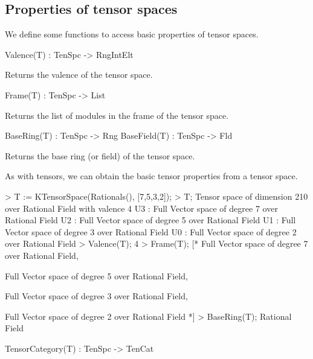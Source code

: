 \subsection{Properties of tensor spaces}

We define some functions to access basic properties of tensor spaces.

\begin{intrinsics}
Valence(T) : TenSpc -> RngIntElt
\end{intrinsics}

Returns the valence of the tensor space.

\begin{intrinsics}
Frame(T) : TenSpc -> List
\end{intrinsics}

Returns the list of modules in the frame of the tensor space.

\begin{intrinsics}
BaseRing(T) : TenSpc -> Rng
BaseField(T) : TenSpc -> Fld
\end{intrinsics}

Returns the base ring (or field) of the tensor space.

\begin{example}[TenSpcProperties]

As with tensors, we can obtain the basic tensor properties from a tensor space.
\begin{code}
> T := KTensorSpace(Rationals(), [7,5,3,2]);
> T;
Tensor space of dimension 210 over Rational Field with valence 4
U3 : Full Vector space of degree 7 over Rational Field
U2 : Full Vector space of degree 5 over Rational Field
U1 : Full Vector space of degree 3 over Rational Field
U0 : Full Vector space of degree 2 over Rational Field
> Valence(T);
4
> Frame(T);
[*
    Full Vector space of degree 7 over Rational Field,

    Full Vector space of degree 5 over Rational Field,

    Full Vector space of degree 3 over Rational Field,

    Full Vector space of degree 2 over Rational Field
*]
> BaseRing(T);
Rational Field
\end{code}
\end{example}


\begin{intrinsics}
TensorCategory(T) : TenSpc -> TenCat
\end{intrinsics}

